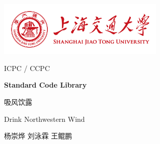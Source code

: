 \documentclass[onecolumn,a4paper]{article}
\begin{document}
\begin{titlepage}
	\begin{center}
		\includegraphics*[width=8cm]{icon-sjtu.png}

		\vspace{2cm}
	
		{\huge ICPC / CCPC}
		
		{\Huge\bfseries Standard Code Library}
		
		\vspace{5cm}

		{\fontsize{30pt}{30pt}\selectfont 吸风饮露}

		\vspace{1cm}

		{\fontsize{20pt}{20pt}\selectfont Drink Northwestern Wind}

		\vspace{2cm}

		{\huge 杨崇烨 \hspace{1cm} 刘泳霖 \hspace{1cm} 王鲲鹏}

		\vspace{1cm}
	\end{center}
\end{titlepage}

\begin{multicols*}{2}
	\tableofcontents
\end{multicols*}

\begin{multicols}{2}

	

	

	

	

	
\end{multicols}
	
\end{document}
